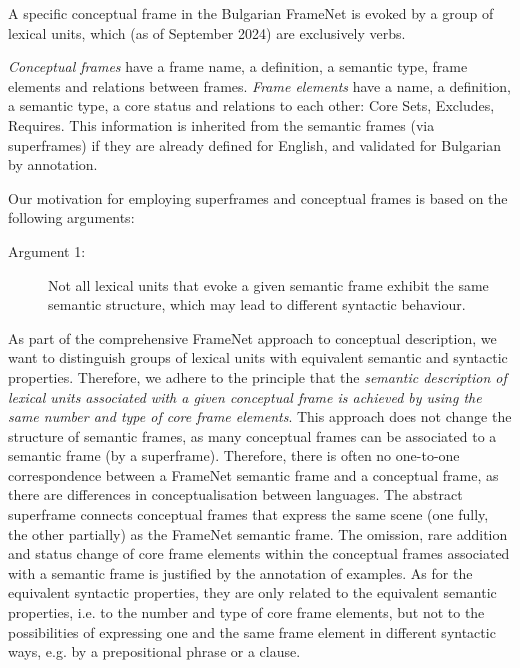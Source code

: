 \documentclass[output=paper,colorlinks,citecolor=brown]{langscibook}
\begin{document}
A specific conceptual frame in the Bulgarian FrameNet is evoked by a group of lexical units, which  (as of September 2024) are exclusively verbs.

\emph{Conceptual frames} have a frame name, a definition, a semantic type, frame elements and relations between frames. \emph{Frame elements} have a name, a definition, a semantic type, a core status and relations to each other: Core Sets, Excludes, Requires. This information is inherited from the semantic frames (via superframes) if they are already defined for English, and validated for Bulgarian by annotation.
 
Our motivation for employing superframes and conceptual frames is based on the following arguments:

\begin{description}
    \item[Argument 1:] Not all lexical units that evoke a given semantic frame exhibit the same semantic structure, which may lead to different syntactic behaviour.
 \end{description}   
As part of the comprehensive FrameNet approach to conceptual description, we want to distinguish groups of lexical units with equivalent semantic and syntactic properties. Therefore, we adhere to the principle that the \emph{semantic description of lexical units associated with a given conceptual frame is achieved by using the same number and type of core frame elements}. This approach does not change the structure of semantic frames, as many conceptual frames can be associated to a semantic frame (by a superframe). Therefore, there is often no one-to-one correspondence between a FrameNet semantic frame and a conceptual frame, as there are differences in conceptualisation between languages. The abstract superframe connects conceptual frames that express the same scene (one fully, the other partially) as the  FrameNet semantic frame. The omission, rare addition and status change of core frame elements within the conceptual frames associated with a semantic frame is justified by the annotation of examples. As for the equivalent syntactic properties, they are only related to the equivalent semantic properties, i.e. to the number and type of core frame elements, but not to the possibilities of expressing one and the same frame element in different syntactic ways, e.g. by a prepositional phrase or a clause.
\end{document}
